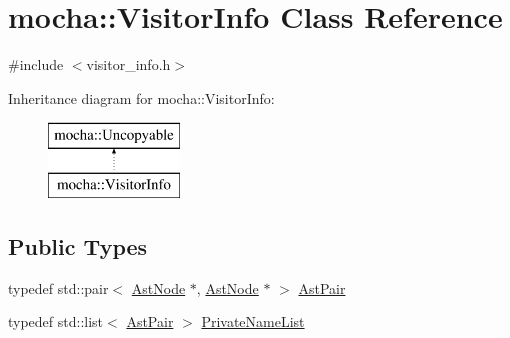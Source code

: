 \hypertarget{classmocha_1_1_visitor_info}{
\section{mocha::VisitorInfo Class Reference}
\label{classmocha_1_1_visitor_info}
}


{\ttfamily \#include $<$visitor\_\-info.h$>$}

Inheritance diagram for mocha::VisitorInfo:\begin{figure}[H]
\begin{center}
\leavevmode
\includegraphics[height=2.000000cm]{classmocha_1_1_visitor_info}
\end{center}
\end{figure}
\subsection*{Public Types}
\begin{DoxyCompactItemize}
\item 
typedef std::pair$<$ \hyperlink{classmocha_1_1_ast_node}{AstNode} $\ast$, \hyperlink{classmocha_1_1_ast_node}{AstNode} $\ast$ $>$ \hyperlink{classmocha_1_1_visitor_info_aca4b022d8c40ae27463f274064950f7e}{AstPair}
\item 
typedef std::list$<$ \hyperlink{classmocha_1_1_visitor_info_aca4b022d8c40ae27463f274064950f7e}{AstPair} $>$ \hyperlink{classmocha_1_1_visitor_info_a04e4999e36bdea0dd35e1b260181bfda}{PrivateNameList}
\end{DoxyCompactItemize}
